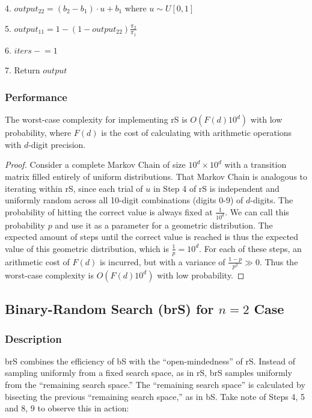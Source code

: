 \documentclass{article}
\begin{document}
4. \hspace{1cm} $output_{22} = (b_2-b_1) \cdot u+b_1$ where $u \sim U[0,1]$

5. \hspace{1cm} $output_{11} = 1 - (1-output_{22})\frac{\pi_2}{\pi_1}$

6. \hspace{1cm} $iters \mathrel{-}= 1$

7. Return $output$

\subsubsection{Performance}
The worst-case complexity for implementing rS is $O(F(d)10^d)$ with low probability, where $F(d)$ is the cost of calculating with arithmetic operations with $d$-digit precision.

\begin{proof}
    Consider a complete Markov Chain of size $10^d \times 10^d$ with a transition matrix filled entirely of uniform distributions. That Markov Chain is analogous to iterating within rS, since each trial of $u$ in Step 4 of rS is independent and uniformly random across all 10-digit combinations (digits 0-9) of $d$-digits. The probability of hitting the correct value is always fixed at $\frac{1}{10^d}$. We can call this probability $p$ and use it as a parameter for a geometric distribution. The expected amount of steps until the correct value is reached is thus the expected value of this geometric distribution, which is $\frac{1}{p} = 10^d$. For each of these steps, an arithmetic cost of $F(d)$ is incurred, but with a variance of $\frac{1-p}{p^2} \gg 0$. Thus the worst-case complexity is $O(F(d)10^d)$ with low probability.
\end{proof}

\subsection{Binary-Random Search (brS) for $n=2$ Case}
\subsubsection{Description}
brS combines the efficiency of bS with the ``open-mindedness'' of rS. Instead of sampling uniformly from a fixed search space, as in rS, brS samples uniformly from the ``remaining search space.'' The ``remaining search space'' is calculated by bisecting the previous ``remaining search space,'' as in bS. Take note of Steps 4, 5 and 8, 9 to observe this in action:
\end{document}

